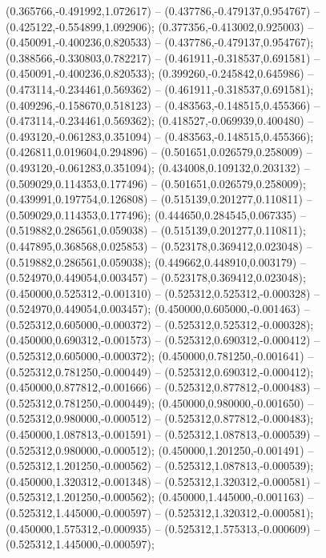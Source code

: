  (0.365766,-0.491992,1.072617) -- (0.437786,-0.479137,0.954767) -- (0.425122,-0.554899,1.092906);
 (0.377356,-0.413002,0.925003) -- (0.450091,-0.400236,0.820533) -- (0.437786,-0.479137,0.954767);
 (0.388566,-0.330803,0.782217) -- (0.461911,-0.318537,0.691581) -- (0.450091,-0.400236,0.820533);
 (0.399260,-0.245842,0.645986) -- (0.473114,-0.234461,0.569362) -- (0.461911,-0.318537,0.691581);
 (0.409296,-0.158670,0.518123) -- (0.483563,-0.148515,0.455366) -- (0.473114,-0.234461,0.569362);
 (0.418527,-0.069939,0.400480) -- (0.493120,-0.061283,0.351094) -- (0.483563,-0.148515,0.455366);
 (0.426811,0.019604,0.294896) -- (0.501651,0.026579,0.258009) -- (0.493120,-0.061283,0.351094);
 (0.434008,0.109132,0.203132) -- (0.509029,0.114353,0.177496) -- (0.501651,0.026579,0.258009);
 (0.439991,0.197754,0.126808) -- (0.515139,0.201277,0.110811) -- (0.509029,0.114353,0.177496);
 (0.444650,0.284545,0.067335) -- (0.519882,0.286561,0.059038) -- (0.515139,0.201277,0.110811);
 (0.447895,0.368568,0.025853) -- (0.523178,0.369412,0.023048) -- (0.519882,0.286561,0.059038);
 (0.449662,0.448910,0.003179) -- (0.524970,0.449054,0.003457) -- (0.523178,0.369412,0.023048);
 (0.450000,0.525312,-0.001310) -- (0.525312,0.525312,-0.000328) -- (0.524970,0.449054,0.003457);
 (0.450000,0.605000,-0.001463) -- (0.525312,0.605000,-0.000372) -- (0.525312,0.525312,-0.000328);
 (0.450000,0.690312,-0.001573) -- (0.525312,0.690312,-0.000412) -- (0.525312,0.605000,-0.000372);
 (0.450000,0.781250,-0.001641) -- (0.525312,0.781250,-0.000449) -- (0.525312,0.690312,-0.000412);
 (0.450000,0.877812,-0.001666) -- (0.525312,0.877812,-0.000483) -- (0.525312,0.781250,-0.000449);
 (0.450000,0.980000,-0.001650) -- (0.525312,0.980000,-0.000512) -- (0.525312,0.877812,-0.000483);
 (0.450000,1.087813,-0.001591) -- (0.525312,1.087813,-0.000539) -- (0.525312,0.980000,-0.000512);
 (0.450000,1.201250,-0.001491) -- (0.525312,1.201250,-0.000562) -- (0.525312,1.087813,-0.000539);
 (0.450000,1.320312,-0.001348) -- (0.525312,1.320312,-0.000581) -- (0.525312,1.201250,-0.000562);
 (0.450000,1.445000,-0.001163) -- (0.525312,1.445000,-0.000597) -- (0.525312,1.320312,-0.000581);
 (0.450000,1.575312,-0.000935) -- (0.525312,1.575313,-0.000609) -- (0.525312,1.445000,-0.000597);
